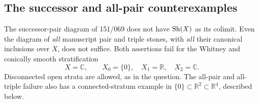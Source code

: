 \subsection{The successor and all-pair counterexamples}
\begin{result}\label{A1.3}
The successor-pair diagram of 151/069 does not have $\operatorname{Sh}(X)$ as its
colimit. Even the diagram of \emph{all} manuscript pair and triple stones,
with \emph{all} their canonical inclusions over $X$, does not suffice.
Both assertions fail for the Whitney and conically smooth stratification
\[
 X=\mathbb C,\qquad X_0=\{0\},\quad X_1=\mathbb R,\quad X_2=\mathbb C.
\]
Disconnected open strata are allowed, as in the question. The all-pair
and all-triple failure also has a connected-stratum example in
$\{0\}\subset\mathbb R^2\subset\mathbb R^4$, described below.
\end{result}
